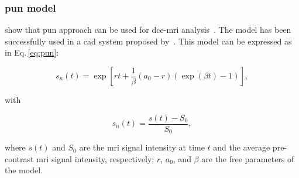 \subsubsection{\acs*{pun} model}

\citeauthor{gliozzi2011phenomenological} show that \ac{pun} approach can be used for \ac{dce}-\ac{mri} analysis~\citep{gliozzi2011phenomenological}.
The model has been successfully used in a \ac{cad} system proposed by~\cite{giannini2015fully}.
This model can be expressed as in Eq.\,\eqref{eq:pun}:

\begin{equation}
  s_n(t) = \exp\left[rt + \frac{1}{\beta} \left( a_0 - r \right) \left( \exp(\beta t) - 1 \right) \right],
  \label{eq:pun}
\end{equation}

\noindent with

\begin{equation}
  s_n(t) = \frac{s(t) - S_0}{S_0},
  \label{eq:enh}
\end{equation}

\noindent where $s(t)$ and $S_0$ are the \ac{mri} signal intensity at time $t$ and the average pre-contrast \ac{mri} signal intensity, respectively; $r$, $a_0$, and $\beta$ are the free parameters of the model.

\subsubsection{}

